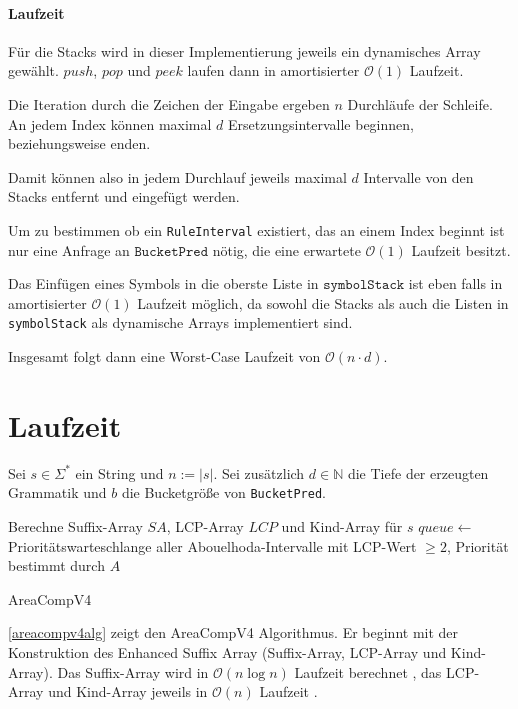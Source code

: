 \paragraph{Laufzeit}

Für die Stacks wird in dieser Implementierung jeweils ein dynamisches Array gewählt. $push$, $pop$ und $peek$ laufen dann in amortisierter $\mathcal{O}(1)$ Laufzeit.

Die Iteration durch die Zeichen der Eingabe ergeben $n$ Durchläufe der Schleife.
An jedem Index können maximal $d$ Ersetzungsintervalle beginnen, beziehungsweise enden.

Damit können also in jedem Durchlauf jeweils maximal $d$ Intervalle von den Stacks entfernt und eingefügt werden.

Um zu bestimmen ob ein \texttt{RuleInterval} existiert, das an einem Index beginnt ist nur eine Anfrage an $\texttt{BucketPred}$ nötig, die eine erwartete $\mathcal{O}(1)$ Laufzeit besitzt.

Das Einfügen eines Symbols in die oberste Liste in $\texttt{symbolStack}$ ist eben falls in amortisierter $\mathcal{O}(1)$ Laufzeit möglich, da sowohl die Stacks als auch die Listen in \texttt{symbolStack} als dynamische Arrays implementiert sind.

Insgesamt folgt dann eine Worst-Case Laufzeit von $\mathcal{O}(n \cdot d)$.

\section{Laufzeit}

Sei $s \in \Sigma^*$ ein String und $n := |s|$. Sei zusätzlich $d \in \mathbb{N}$ die Tiefe der erzeugten Grammatik und $b$ die Bucketgröße von \texttt{BucketPred}.

\begin{algorithm}[t]
    Berechne Suffix-Array $SA$, LCP-Array $LCP$ und Kind-Array für $s$\;
    $queue \leftarrow$ Prioritätswarteschlange aller Abouelhoda-Intervalle mit LCP-Wert $\geq 2$, Priorität bestimmt durch $A$\;
    \caption{AreaCompV4}
    \label{areacompv4alg}
\end{algorithm}


\autoref{areacompv4alg} zeigt den AreaCompV4 Algorithmus.
Er beginnt mit der Konstruktion des Enhanced Suffix Array (Suffix-Array, LCP-Array und Kind-Array). Das Suffix-Array wird in $\mathcal{O}(n \log n)$ Laufzeit berechnet \cite{larsson_faster_2007}, das LCP-Array und Kind-Array jeweils in $\mathcal{O}(n)$ Laufzeit \cite{kasai_linear-time_2001, abouelhoda_optimal_2002}.

